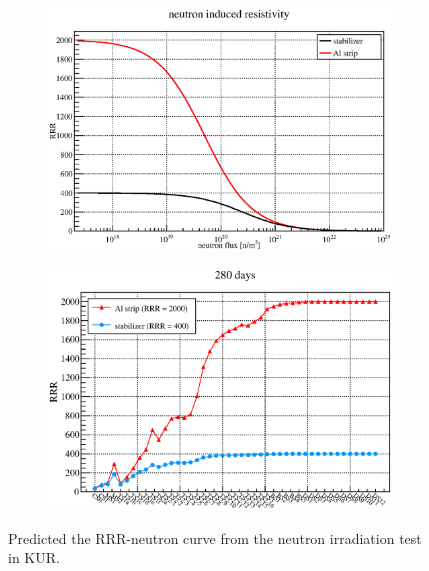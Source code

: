   \begin{figure}[H]
   \begin{subfigure}{0.3\textwidth}
    \centering
	\includegraphics[scale=0.43]{chapter5/fig/degradation.eps}
   \end{subfigure}
   \hspace{0.2\textwidth}
   \begin{subfigure}{0.3\textwidth}
    \centering
	\includegraphics[scale=0.43]{chapter5/fig/rrrmagnets.eps}
   \end{subfigure}
   \caption{ Predicted the RRR-neutron curve from the neutron irradiation test in KUR.}
   \label{4rrr}
  \end{figure}


